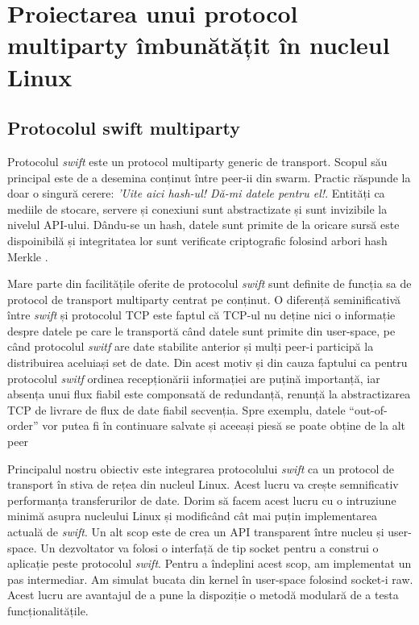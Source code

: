
\chapter{Proiectarea unui protocol multiparty îmbunătățit în nucleul Linux}
\label{chapter:multiparty}

\section{Protocolul swift multiparty}
\label{sec:multiparty:swift}

Protocolul \textit{swift} este un protocol multiparty generic de transport.
Scopul său principal este de a desemina conținut între peer-ii din swarm.
Practic răspunde la doar o singură cerere: \textit{'Uite aici hash-ul!
Dă-mi datele pentru el!}. Entități ca mediile de stocare, servere și
conexiuni sunt abstractizate și sunt invizibile la nivelul API-ului.
Dându-se un hash, datele sunt primite de la oricare sursă este dispoinibilă
și integritatea lor sunt verificate criptografic folosind arbori hash
Merkle \cite{merkle}.

Mare parte din facilitățile oferite de protocolul \textit{swift} sunt
definite de funcția sa de protocol de transport multiparty centrat pe
conținut. O diferență seminificativă între \textit{swift} și protocolul TCP
este faptul că TCP-ul nu deține nici o informație despre datele pe care le
transportă când datele sunt primite din user-space, pe când protocolul
\textit{switf} are date stabilite anterior și mulți peer-i participă la
distribuirea aceluiași set de date. Din acest motiv și din cauza faptului
ca pentru protocolul \textit{switf} ordinea recepționării informației are
puțină importanță, iar absența unui flux fiabil este componsată de redundanță,
renunță la abstractizarea TCP de livrare de flux de date fiabil secvenția.
Spre exemplu, datele ``out-of-order'' vor putea fi în continuare salvate și
aceeași piesă se poate obține de la alt peer

Principalul nostru obiectiv este integrarea protocolului \textit{swift} ca
un protocol de transport în stiva de rețea din nucleul Linux. Acest lucru
va crește semnificativ performanța transferurilor de date. Dorim să facem
acest lucru cu o intruziune minimă asupra nucleului Linux și modificând cât
mai puțin implementarea actuală de \textit{swift}. Un alt scop este de crea
un API transparent între nucleu și user-space. Un dezvoltator va folosi o
interfață de tip socket pentru a construi o aplicație peste protocolul
\textit{swift}. Pentru a îndeplini acest scop, am implementat un pas
intermediar. Am simulat bucata din kernel în user-space folosind socket-i
raw. Acest lucru are avantajul de a pune la dispoziție o metodă modulară de
a testa funcționalitățile.

